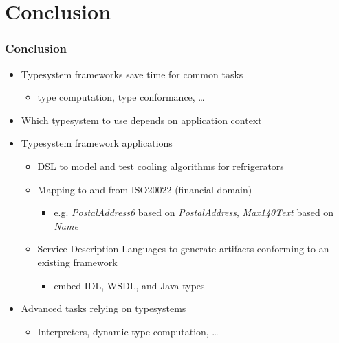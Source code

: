 \section{Conclusion}

\begin{frame}
  \frametitle{Conclusion}
  
  
  \begin{itemize}
    \item Typesystem frameworks save time for common tasks
    \begin{itemize}
      \item type computation, type conformance, \ldots
    \end{itemize}
    \item Which typesystem to use depends on application context
    \item Typesystem framework applications
    \begin{itemize}
      \item DSL to model and test cooling algorithms for refrigerators 
      \item Mapping to and from ISO20022 (financial domain)
      \begin{itemize}
        \item e.g. \emph{PostalAddress6} based on \emph{PostalAddress},
        \emph{Max140Text} based on \emph{Name}
      \end{itemize}
      \item Service Description Languages to generate artifacts conforming
      to an existing framework
      \begin{itemize}
        \item embed IDL, WSDL, and Java types
      \end{itemize}
    \end{itemize}
    \item Advanced tasks relying on typesystems
    \begin{itemize}
      \item Interpreters, dynamic type computation, \ldots
    \end{itemize}
  \end{itemize}
  
\end{frame}

